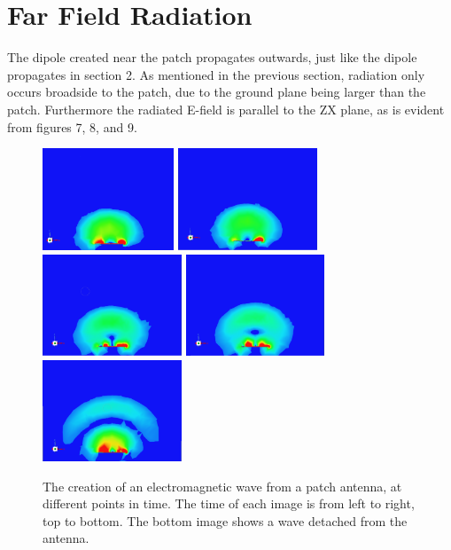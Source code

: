 \documentclass[12pt]{article}
\begin{document}
\section{Far Field Radiation}

The dipole created near the patch propagates outwards, just like the dipole propagates in section 2. As mentioned in the previous section, radiation only occurs broadside to the patch, due to the ground plane being larger than the patch. Furthermore the radiated E-field is parallel to the ZX plane, as is evident from figures 7, 8, and 9. 

\begin{figure}[h]
    \centering
    \includegraphics[width=0.35\textwidth]{basic-patch-antenna-radiating-t0.png} 
    \includegraphics[width=0.37\textwidth]{basic-patch-antenna-radiating-t1.png}
    \includegraphics[width=0.37\textwidth]{basic-patch-antenna-radiating-t2.png}
    \includegraphics[width=0.37\textwidth]{basic-patch-antenna-radiating-t3.png}
    \includegraphics[width=0.37\textwidth]{basic-patch-antenna-radiating-t4.png}
    \caption{The creation of an electromagnetic wave from a patch antenna, at different points in time. The time of each image is from left to right, top to bottom. The bottom image shows a wave detached from the antenna.}
\end{figure} 
\end{document}
